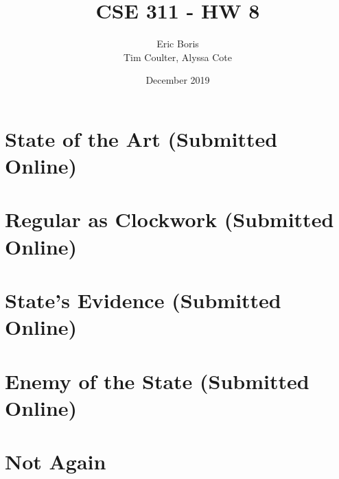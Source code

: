 \documentclass[11pt]{article}
\title{CSE 311 - HW 8}
\author{Eric Boris \\ Tim Coulter, Alyssa Cote}
\date{December 2019}
\makeatletter
\renewcommand{\maketitle}{\bgroup\setlength{\parindent}{0pt}
\begin{flushleft}
  \textbf{\@title}

  \@author
  
  \@date
\end{flushleft}\egroup
}
\makeatother
\begin{document}
\maketitle

\section{State of the Art (Submitted Online)}

\section{Regular as Clockwork (Submitted Online)}

\section{State's Evidence (Submitted Online)}

\section{Enemy of the State (Submitted Online)}

\section{Not Again} %
\end{document}
